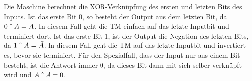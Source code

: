 \begin{exercise}{5}

\newcommand\XOR{\mathbin{\char`\^}}

Die Maschine berechnet die XOR-Verkn\"upfung des ersten und letzten Bits des Inputs. Ist das erste Bit 0, so besteht der Output aus dem letzten Bit, da $0\XOR A = A$. In diesem Fall geht die TM einfach auf das letzte Inputbit und terminiert dort. Ist das erste Bit 1, ist der Output die Negation des letzten Bits, da $1\XOR A = \bar{A}$. In diesem Fall geht die TM auf das letzte Inputbit und invertiert es, bevor sie terminiert. F\"ur den Spezialfall, dass der Input nur aus einem Bit besteht, ist die Antwort immer 0, da dieses Bit dann mit sich selber verkn\"upft wird und $A\XOR A = 0$.

\end{exercise}
